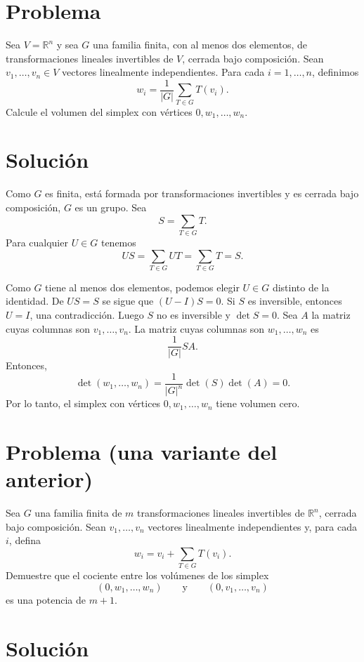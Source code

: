 \documentclass[11pt]{amsproc}
\begin{document}
\section*{Problema}

Sea $V=\mathbb{R}^n$ y sea $ G$ una familia finita, con al menos dos
elementos, de transformaciones lineales invertibles de $V$, cerrada bajo
composición.
Sean $v_1,\dots,v_n\in V$ vectores linealmente independientes. Para cada
$i=1,\dots,n$, definimos
\[
    w_i=\frac1{| G|}\sum_{T\in G}T(v_i).
\]
Calcule el volumen del simplex con vértices
$0,w_1,\dots,w_n$.

\section*{Solución}
Como $ G$ es finita, está formada por transformaciones invertibles y
es cerrada bajo composición, $ G$ es un grupo.
Sea
\[
    S=\sum_{T\in G}T.
\]
Para cualquier $U\in G$ tenemos
\[
    US=\sum_{T\in G}UT
      =\sum_{T\in G}T
      =S.
\]

Como $ G$ tiene al menos dos elementos, podemos elegir $U\in G$ distinto de la
identidad. De $US=S$ se sigue que $(U-I)S=0$. Si $S$ es inversible, entonces
$U=I$, una contradicción. Luego $S$ no es inversible y $\det S=0$.  Sea $A$ la
matriz cuyas columnas son $v_1,\dots,v_n$. La matriz cuyas columnas son
$w_1,\dots,w_n$ es
\[
    \frac1{| G|}SA.
\]
Entonces, 
\[
\det(w_1,\dots,w_n)
    =\frac{1}{| G|^n}\det(S)\det(A)
    =0.
\]
Por lo tanto, el simplex con vértices $0,w_1,\dots,w_n$ tiene volumen cero. 

\section*{Problema (una variante del anterior)}
Sea $ G$ una familia finita de $m$ transformaciones lineales
invertibles de $\mathbb R^n$, cerrada bajo composición. Sean
$v_1,\dots,v_n$ vectores linealmente independientes y, para cada $i$, defina
\[
    w_i=v_i+\sum_{T\in G}T(v_i).
\]
Demuestre que el cociente entre los volúmenes de los simplex
\[
    (0,w_1,\dots,w_n)
    \qquad\text{y}\qquad
    (0,v_1,\dots,v_n)
\]
es una potencia de $m+1$.

\section*{Solución}
\end{document}
